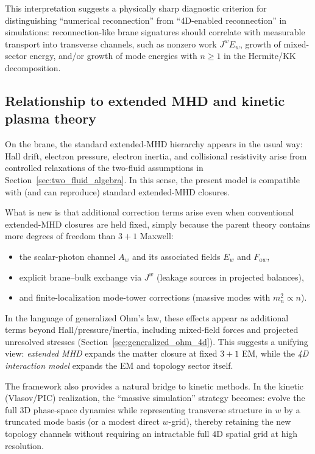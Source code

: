 \documentclass[11pt]{article}
\begin{document}
This interpretation suggests a physically sharp diagnostic criterion for distinguishing
``numerical reconnection'' from ``4D-enabled reconnection'' in simulations: reconnection-like
brane signatures should correlate with measurable transport into transverse channels,
such as nonzero work \(J^wE_w\), growth of mixed-sector energy, and/or growth of mode
energies with \(n\ge 1\) in the Hermite/KK decomposition.

\subsection{Relationship to extended MHD and kinetic plasma theory}
On the brane, the standard extended-MHD hierarchy appears in the usual way:
Hall drift, electron pressure, electron inertia, and collisional resistivity arise
from controlled relaxations of the two-fluid assumptions in
Section~\ref{sec:two_fluid_algebra}. In this sense, the present model is compatible
with (and can reproduce) standard extended-MHD closures.

What is new is that additional correction terms arise even when conventional
extended-MHD closures are held fixed, simply because the parent theory contains
more degrees of freedom than \(3+1\) Maxwell:
\begin{itemize}[leftmargin=1.7em]
\item the scalar-photon channel \(A_w\) and its associated fields \(E_w\) and \(F_{aw}\),
\item explicit brane--bulk exchange via \(J^w\) (leakage sources in projected balances),
\item and finite-localization mode-tower corrections (massive modes with \(m_n^2\propto n\)).
\end{itemize}
In the language of generalized Ohm's law, these effects appear as additional terms
beyond Hall/pressure/inertia, including mixed-field forces and projected unresolved
stresses (Section~\ref{sec:generalized_ohm_4d}). This suggests a unifying view:
\emph{extended MHD} expands the matter closure at fixed \(3+1\) EM, while the
\emph{4D interaction model} expands the EM and topology sector itself.

The framework also provides a natural bridge to kinetic methods. In the kinetic
(Vlasov/PIC) realization, the ``massive simulation'' strategy becomes: evolve the
full \(3\)D phase-space dynamics while representing transverse structure in \(w\) by
a truncated mode basis (or a modest direct \(w\)-grid), thereby retaining the new
topology channels without requiring an intractable full \(4\)D spatial grid at
high resolution.
\end{document}
